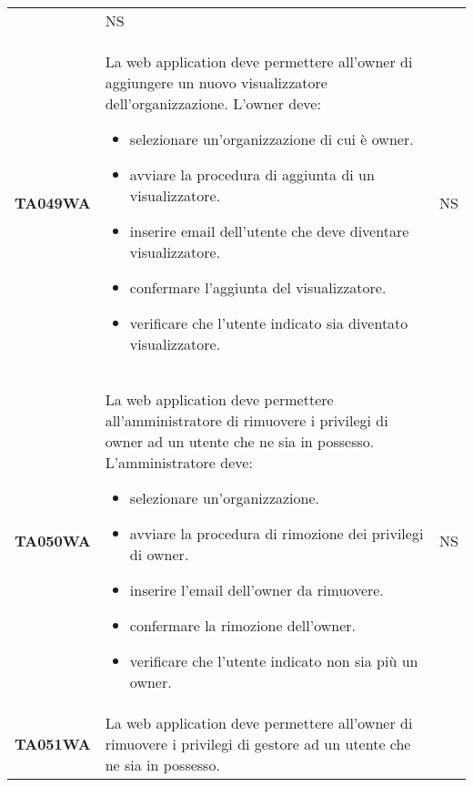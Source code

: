 \documentclass[../../piano-di-qualifica.tex]{subfiles}
\begin{document}
\begin{longtable}[H]{>{\centering\bfseries}m{3cm} >{}m{10cm} >{\centering\arraybackslash}m{3cm}}
                    & NS                                                                                                                                                                                                                                                               \\
  TA049WA           & La web application deve permettere all'owner di aggiungere un nuovo visualizzatore dell'organizzazione. \newline
  L'owner deve:
  \begin{itemize}
    \item selezionare un'organizzazione di cui è owner.
    \item avviare la procedura di aggiunta di un visualizzatore.
    \item inserire email dell'utente che deve diventare visualizzatore.
    \item confermare l'aggiunta del visualizzatore.
    \item verificare che l'utente indicato sia diventato visualizzatore.
  \end{itemize}
                    & NS                                                                                                                                                                                                                                                               \\
  TA050WA           & La web application deve permettere all'amministratore di rimuovere i privilegi di owner ad un utente che ne sia in possesso. \newline
  L'amministratore deve:
  \begin{itemize}
    \item selezionare un'organizzazione.
    \item avviare la procedura di rimozione dei privilegi di owner.
    \item inserire l'email dell'owner da rimuovere.
    \item confermare la rimozione dell'owner.
    \item verificare che l'utente indicato non sia più un owner.
  \end{itemize}
                    & NS                                                                                                                                                                                                                                                               \\
  TA051WA           & La web application deve permettere all'owner di rimuovere i privilegi di gestore ad un utente che ne sia in possesso. \newline

\end{longtable}
\end{document}

